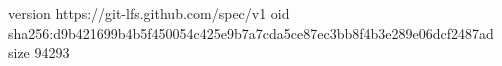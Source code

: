 version https://git-lfs.github.com/spec/v1
oid sha256:d9b421699b4b5f450054c425e9b7a7cda5ce87ec3bb8f4b3e289e06dcf2487ad
size 94293

